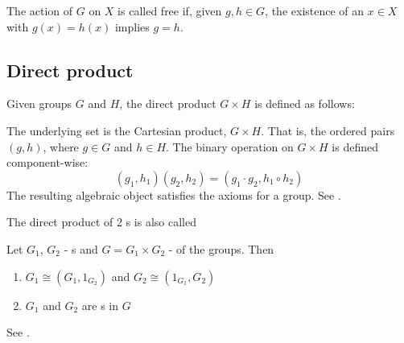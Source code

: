 \begin{appendices}
\begin{definition}
  The action of $G$ on $X$ is called \cite{wiki:groupaction}
  free if, given $g, h \in G$, the existence of an $x \in X$ with $g(x)
  = h(x)$ implies $g = h$.
  \label{def:freeaction}
\end{definition}

\subsection{Direct product}

\begin{definition}
  Given groups $G$ and $H$, the direct product $G \times H$ is defined as follows:

  The underlying set is the Cartesian product, $G \times H$. That is, the
  ordered pairs $\left(g,h\right)$, where $g \in G$ and $h \in H$. 
  The binary operation on $G \times H$ is defined component-wise:
  \[
  \left(g_1,h_1\right)\left(g_2,h_2\right) =
  \left(g_1 \cdot g_2, h_1 \circ h_2\right)
  \]
  The resulting algebraic object satisfies the axioms for a group.
  See \cite{wiki:directproduct}.

  The direct product of 2 s is also called
  
  \label{def:directproduct}
\end{definition}

\begin{property}
  Let $G_1$, $G_2$ - s and $G = G_1 \times G_2$ -
   of the groups. Then
  \begin{enumerate}
  \item $G_1 \cong \left(G_1, 1_{G_2}\right)$ and
    $G_2 \cong \left(1_{G_1}, G_2\right)$
  \item $G_1$ and $G_2$ are s in $G$
  \end{enumerate}
  See \cite{wiki:directproduct}.
  \label{property:directproduct}
\end{property}


\end{appendices}
